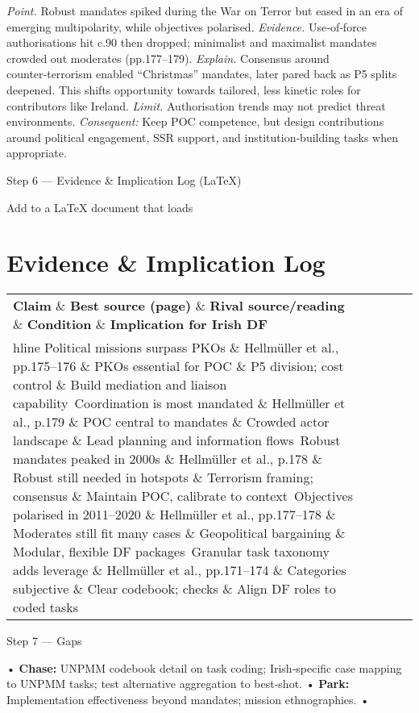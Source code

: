 \textit{Point.} Robust mandates spiked during the War on Terror but eased in an era of emerging multipolarity, while objectives polarised. \textit{Evidence.} Use‑of‑force authorisations hit c.90 then dropped; minimalist and maximalist mandates crowded out moderates (pp.177–179). \textit{Explain.} Consensus around counter‑terrorism enabled “Christmas” mandates, later pared back as P5 splits deepened. This shifts opportunity towards tailored, less kinetic roles for contributors like Ireland. \textit{Limit.} Authorisation trends may not predict threat environments. \textit{Consequent:} Keep POC competence, but design contributions around political engagement, SSR support, and institution‑building tasks when appropriate.

Step 6 — Evidence \& Implication Log (LaTeX)

Add to a LaTeX document that loads  \section*{Evidence \& Implication Log} \begin{tabular}{p{3.2cm}p{4.2cm}p{3.6cm}p{3.2cm}p{4.2cm}} \textbf{Claim} \& \textbf{Best source (page)} \& \textbf{Rival source/reading} \& \textbf{Condition} \& \textbf{Implication for Irish DF}\\hline Political missions surpass PKOs \& Hellmüller et al., pp.175–176 \& PKOs essential for POC \& P5 division; cost control \& Build mediation and liaison capability\ Coordination is most mandated \& Hellmüller et al., p.179 \& POC central to mandates \& Crowded actor landscape \& Lead planning and information flows\ Robust mandates peaked in 2000s \& Hellmüller et al., p.178 \& Robust still needed in hotspots \& Terrorism framing; consensus \& Maintain POC, calibrate to context\ Objectives polarised in 2011–2020 \& Hellmüller et al., pp.177–178 \& Moderates still fit many cases \& Geopolitical bargaining \& Modular, flexible DF packages\ Granular task taxonomy adds leverage \& Hellmüller et al., pp.171–174 \& Categories subjective \& Clear codebook; checks \& Align DF roles to coded tasks\ \end{tabular}

Step 7 — Gaps

• \textbf{Chase:} UNPMM codebook detail on task coding; Irish‑specific case mapping to UNPMM tasks; test alternative aggregation to best‑shot. • \textbf{Park:} Implementation effectiveness beyond mandates; mission ethnographies. •

\parencite{KEOHANE_1969}

